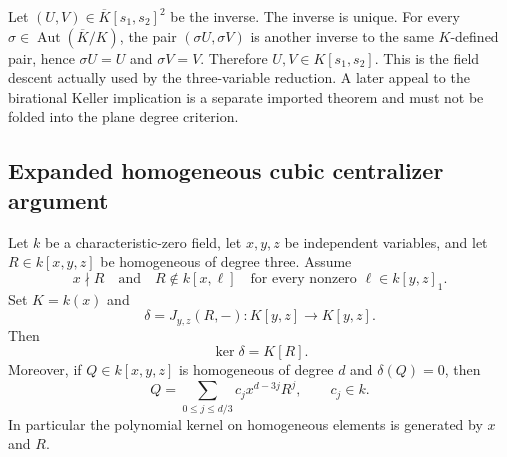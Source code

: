 Let $(U,V)\in\overline K[s_1,s_2]^2$ be the inverse.  The inverse is unique.
For every $\sigma\in\operatorname{Aut}(\overline K/K)$, the pair
$(\sigma U,\sigma V)$ is another inverse to the same $K$-defined pair, hence
$\sigma U=U$ and $\sigma V=V$.  Therefore $U,V\in K[s_1,s_2]$.  This is the
field descent actually used by the three-variable reduction.  A later appeal
to the birational Keller implication is a separate imported theorem and must
not be folded into the plane degree criterion.

\subsection{Expanded homogeneous cubic centralizer argument}

\begin{lemma}
Let $k$ be a characteristic-zero field, let $x,y,z$ be independent variables,
and let $R\in k[x,y,z]$ be homogeneous of degree three.  Assume
\[
x\nmid R
\quad\text{and}\quad
R\notin k[x,\ell]
\quad\text{for every nonzero }\ell\in k[y,z]_1.
\]
Set $K=k(x)$ and
\[
\delta=J_{y,z}(R,-):K[y,z]\longrightarrow K[y,z].
\]
Then
\[
\ker\delta=K[R].
\]
Moreover, if $Q\in k[x,y,z]$ is homogeneous of degree $d$ and
$\delta(Q)=0$, then
\[
Q=\sum_{0\le j\le d/3}c_jx^{d-3j}R^j,
\qquad c_j\in k.
\]
In particular the polynomial kernel on homogeneous elements is generated by
$x$ and $R$.
\end{lemma}

